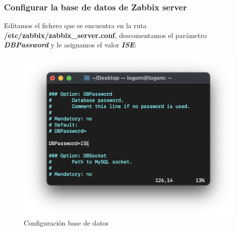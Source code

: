     \subsubsection{Configurar la base de datos de Zabbix server}
    Editamos el fichero que se encuentra en la ruta \textbf{/etc/zabbix/zabbix\_server.conf}, descomentamos el parámetro \textbf{\emph{DBPassword}} y le asignamos el valor
    \textbf{\emph{ISE}}:
    \begin{figure}[H]
        \centering
        \includegraphics[scale=0.4]{images/zabbix_server_conf.png}
        \caption{Configuración base de datos}
        \label{fig:zabbix_conf}
    \end{figure}

